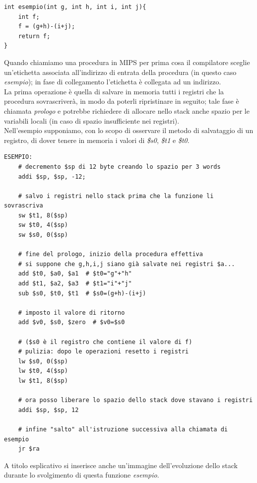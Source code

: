 \documentclass[class=book, crop=false]{standalone}
\begin{document}
\begin{verbatim}
int esempio(int g, int h, int i, int j){
	int f;
	f = (g+h)-(i+j);
	return f;
}
\end{verbatim}

Quando chiamiamo una procedura in MIPS per prima cosa il compilatore sceglie un’etichetta associata all’indirizzo di entrata della procedura (in questo caso \emph{esempio}); in fase di collegamento l'etichetta è collegata ad un indirizzo.\\
La prima operazione è quella di salvare in memoria tutti i registri che la procedura sovrascriverà, in modo da poterli ripristinare in seguito; tale fase è chiamata \emph{prologo} e potrebbe richiedere di allocare nello stack anche spazio per le variabili locali (in caso di spazio insufficiente nei registri).\\
Nell'esempio supponiamo, con lo scopo di osservare il metodo di salvataggio di un registro, di dover tenere in memoria i valori di \emph{\$s0}, \emph{\$t1} e \emph{\$t0}.

\begin{verbatim}
ESEMPIO:
	# decremento $sp di 12 byte creando lo spazio per 3 words
	addi $sp, $sp, -12;

	# salvo i registri nello stack prima che la funzione li sovrascriva
	sw $t1, 8($sp)
	sw $t0, 4($sp)
	sw $s0, 0($sp)

	# fine del prologo, inizio della procedura effettiva
	# si suppone che g,h,i,j siano già salvate nei registri $a...
	add $t0, $a0, $a1  # $t0="g"+"h"
	add $t1, $a2, $a3  # $t1="i"+"j"
	sub $s0, $t0, $t1  # $s0=(g+h)-(i+j)

	# imposto il valore di ritorno
	add $v0, $s0, $zero  # $v0=$s0

	# ($s0 è il registro che contiene il valore di f)
	# pulizia: dopo le operazioni resetto i registri
	lw $s0, 0($sp)
	lw $t0, 4($sp)
	lw $t1, 8($sp)

	# ora posso liberare lo spazio dello stack dove stavano i registri
	addi $sp, $sp, 12

	# infine "salto" all'istruzione successiva alla chiamata di esempio
	jr $ra
\end{verbatim}

A titolo esplicativo si inserisce anche un'immagine dell'evoluzione dello stack durante lo svolgimento di questa funzione \emph{esempio}.
\end{document}
